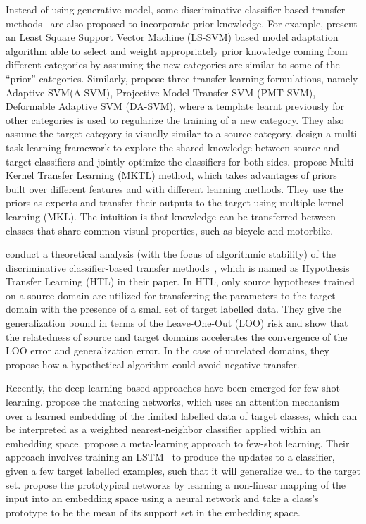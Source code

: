 \documentclass[prodmode]{acmsmall}  %
\begin{document}
Instead of using generative model, some discriminative classifier-based transfer methods~\cite{Tommasi2010,Aytar2011,Ma2014,Jie2011} are also proposed to incorporate prior knowledge. For example,  present an Least Square Support Vector Machine (LS-SVM) based model adaptation algorithm able to select and weight appropriately prior knowledge coming from different categories by assuming the new categories are similar to some of the ``prior'' categories. Similarly,  propose three transfer learning formulations, namely Adaptive SVM(A-SVM), Projective Model Transfer SVM (PMT-SVM), Deformable Adaptive SVM (DA-SVM), where a template learnt previously for other categories is used to regularize the training of a new category. They also assume the target category is visually similar to a source category.
 design a multi-task learning framework to explore the shared knowledge between source and target classifiers and jointly optimize the classifiers for both sides. %
 propose Multi Kernel Transfer Learning (MKTL) method, which takes advantages of priors built over different features and with different learning methods. They use the priors as experts and transfer their outputs to the target using multiple kernel learning (MKL). The intuition is that knowledge can be transferred between classes that share common visual properties, such as bicycle and motorbike.

 conduct a theoretical analysis (with the focus of algorithmic stability) of the discriminative classifier-based transfer methods~\cite{Tommasi2010,Aytar2011,Ma2014,Jie2011}, which is named as Hypothesis Transfer Learning (HTL) in their paper. In HTL, only source hypotheses trained on a source domain are utilized for transferring the parameters to the target domain with the presence of a small set of target labelled data. They give the generalization bound in terms of the Leave-One-Out (LOO) risk and show that the relatedness of source and target domains accelerates the convergence of the LOO error and generalization error. In the case of unrelated domains, they propose how a hypothetical algorithm could avoid negative transfer.

Recently, the deep learning based approaches have been emerged for few-shot learning. %
 propose the matching networks, which uses an attention mechanism over a learned embedding of the limited labelled data of target classes, which can be interpreted as a weighted nearest-neighbor classifier applied within an embedding space. 
propose a meta-learning approach to few-shot learning. Their approach involves training an LSTM~\cite{Hochreiter1997} to produce the updates to a classifier, given a few target labelled examples, such that it will generalize well to the target set.  propose the prototypical networks by learning a non-linear mapping of the input into an embedding space using a neural network and take a class's prototype to be the mean of its support set in the embedding space. 
\end{document}
